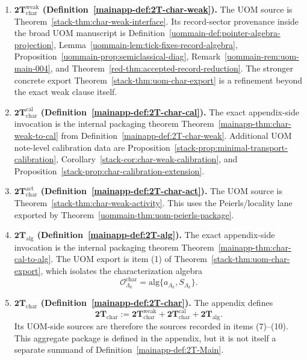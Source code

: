 \documentclass[11pt]{article}
\theoremstyle{definition}
\theoremstyle{plain}
\theoremstyle{remark}
\begin{document}
\begin{enumerate}[leftmargin=2em]
\item \textbf{\(\mathbf{2T}_{\mathrm{char}}^{\mathrm{weak}}\) \textnormal{(Definition~\ref*{mainapp-def:2T-char-weak})}.}
  The UOM source is Theorem~\ref*{stack-thm:char-weak-interface}.
  Its record-sector provenance inside the broad UOM manuscript is
  Definition~\ref*{uommain-def:pointer-algebra-projection},
  Lemma~\ref*{uommain-lem:tick-fixes-record-algebra},
  Proposition~\ref*{uommain-prop:semiclassical-diag},
  Remark~\ref*{uommain-rem:uom-main-004}, and
  Theorem~\ref*{red-thm:accepted-record-reduction}.
  The stronger concrete export
  Theorem~\ref*{stack-thm:uom-char-export} is a refinement beyond the exact weak clause itself.

\item \textbf{\(\mathbf{2T}_{\mathrm{char}}^{\mathrm{cal}}\) \textnormal{(Definition~\ref*{mainapp-def:2T-char-cal})}.}
  The exact appendix-side invocation is the internal packaging theorem
  Theorem~\ref*{mainapp-thm:char-weak-to-cal} from
  Definition~\ref*{mainapp-def:2T-char-weak}.
  Additional UOM note-level calibration data are
  Proposition~\ref*{stack-prop:minimal-transport-calibration},
  Corollary~\ref*{stack-cor:char-weak-calibration}, and
  Proposition~\ref*{stack-prop:char-calibration-extension}.

\item \textbf{\(\mathbf{2T}_{\mathrm{char}}^{\mathrm{act}}\) \textnormal{(Definition~\ref*{mainapp-def:2T-char-act})}.}
  The UOM source is Theorem~\ref*{stack-thm:char-weak-activity}.
  This uses the Peierls/locality lane exported by Theorem~\ref*{uommain-thm:uom-peierls-package}.

\item \textbf{\(\mathbf{2T}_{\mathrm{alg}}\) \textnormal{(Definition~\ref*{mainapp-def:2T-alg})}.}
  The exact appendix-side invocation is the internal packaging theorem
  Theorem~\ref*{mainapp-thm:char-cal-to-alg}.
  The UOM export is item \textup{(1)} of
  Theorem~\ref*{stack-thm:uom-char-export}, which isolates the characterization algebra
  \[
  \mathcal O^{\mathrm{char}}_{\Lambda_k}
  =
  \mathrm{alg}\{a_{\Lambda_k},S_{\Lambda_k}\}.
  \]

\item \textbf{\(\mathbf{2T}_{\mathrm{char}}\) \textnormal{(Definition~\ref*{mainapp-def:2T-char})}.}
  The appendix defines
  \[
  \mathbf{2T}_{\mathrm{char}}
  :=
  \mathbf{2T}_{\mathrm{char}}^{\mathrm{weak}}
  + \mathbf{2T}_{\mathrm{char}}^{\mathrm{cal}}
  + \mathbf{2T}_{\mathrm{alg}}.
  \]
  Its UOM-side sources are therefore the sources recorded in items \textup{(7)}--\textup{(10)}.
  This aggregate package is defined in the appendix, but it is not itself a separate summand of
  Definition~\ref*{mainapp-def:2T-Main}.


\end{enumerate}
\end{document}
